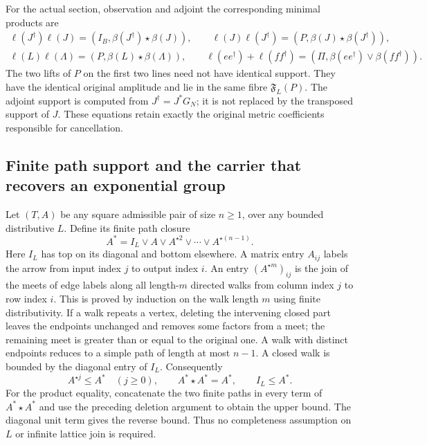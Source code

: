 \documentclass[11pt]{article}
\begin{document}
For the actual section, observation and adjoint the corresponding
minimal products are
\begin{equation}\tag{CLM7}
\begin{gathered}
\ell(J^\dagger)\ell(J)
 =(I_B,\beta(J^\dagger)\star\beta(J)),\qquad
\ell(J)\ell(J^\dagger)
 =(P,\beta(J)\star\beta(J^\dagger)),\\
\ell(L)\ell(\Lambda)
 =(P,\beta(L)\star\beta(\Lambda)),\qquad
\ell(ee^\dagger)+\ell(ff^\dagger)
 =(\Pi,\beta(ee^\dagger)\vee\beta(ff^\dagger)).
\end{gathered}
\end{equation}
The two lifts of $P$ on the first two lines need not have identical
support. They have the identical original amplitude and lie in the
same fibre $\mathfrak F_L(P)$. The adjoint support is computed from
$J^\dagger=J^*G_N$; it is not replaced by the transposed support of
$J$. These equations retain exactly the original metric coefficients
responsible for cancellation.

\subsection{Finite path support and the carrier that recovers an exponential group}

Let $(T,A)$ be any square admissible pair of size $n\ge1$, over any
bounded distributive $L$. Define its finite path closure
\begin{equation}\tag{CLM8}
A^*=I_L\vee A\vee A^{\star2}\vee\cdots\vee A^{\star(n-1)}.
\end{equation}
Here $I_L$ has top on its diagonal and bottom elsewhere. A matrix entry
$A_{ij}$ labels the arrow from input index $j$ to output index $i$.
An entry $(A^{\star m})_{ij}$ is the join of the meets of edge labels
along all length-$m$ directed walks from column index $j$ to row index
$i$. This is proved by induction on the walk length $m$ using finite
distributivity. If a walk repeats a
vertex, deleting the intervening closed part leaves the endpoints
unchanged and removes some factors from a meet; the remaining meet is
greater than or equal to the original one. A walk with distinct
endpoints reduces to a simple path of length at most $n-1$. A closed
walk is bounded by the diagonal entry of $I_L$. Consequently
\begin{equation}\tag{CLM9}
A^{\star j}\le A^*\quad(j\ge0),\qquad
A^*\star A^*=A^*,\qquad I_L\le A^*.
\end{equation}
For the product equality, concatenate the two finite paths in every
term of $A^*\star A^*$ and use the preceding deletion argument to obtain
the upper bound. The diagonal unit term gives the reverse bound. Thus
no completeness assumption on $L$ or infinite lattice join is required.
\end{document}
